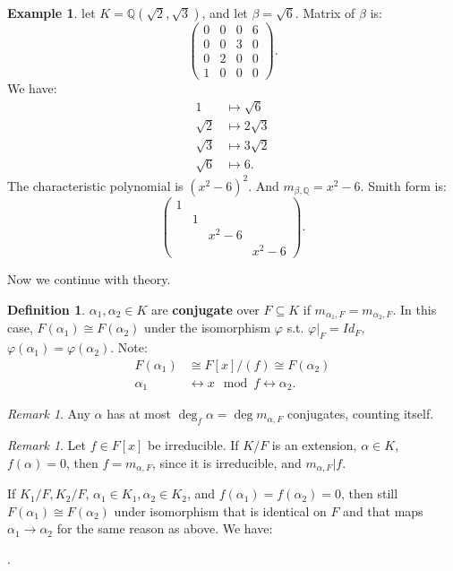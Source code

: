 \documentclass[9pt,reqno,twoside]{amsbook}
\theoremstyle{plain}
\numberwithin{section}{chapter}
\numberwithin{equation}{chapter}
\theoremstyle{definition}
\newtheorem{Def}[theorem]{Definition}
\newtheorem{Ex}[theorem]{Example}
\theoremstyle{remark}
\newtheorem{rem}[theorem]{Remark}
\theoremstyle{plain}
\newcommand{\sub}{\subseteq}
\newcommand{\Q}{\mathbb{Q}}
\newcommand{\bee}{\begin{equation}\begin{aligned}}
\newcommand{\eee}{\end{aligned}\end{equation}}
\newcommand{\lpar}{\left(}
\newcommand{\rpar}{\right)}
\renewcommand{\phi}{\varphi}
\begin{document}
\begin{Ex}
let $K = \Q(\sqrt{2},\sqrt{3})$, and let $\beta = \sqrt{6}$. Matrix of $\beta$ is:
$$
\lpar 
\begin{matrix}
0 & 0 & 0 & 6\\
0 & 0 & 3 & 0\\
0 & 2 & 0 & 0\\
1 & 0 & 0 & 0
\end{matrix} \rpar.
$$
We have:
\bee
1 &\mapsto \sqrt{6}\\
\sqrt{2} & \mapsto 2\sqrt{3}\\
\sqrt{3} & \mapsto 3 \sqrt{2}\\
\sqrt{6} &\mapsto 6.
\eee
The characteristic polynomial is $(x^2 - 6)^2$. And $m_{\beta,\Q} = x^2 - 6$. Smith form is:
$$
\lpar 
\begin{matrix}
1 & & &\\
& 1\\
& & x^2 - 6\\
&&&x^2 - 6
\end{matrix} \rpar.
$$
\end{Ex}

Now we continue with theory. 

\begin{Def}
$\alpha_1,\alpha_2 \in K$ are \textbf{conjugate} over $F \sub K$ if $m_{\alpha_1,F} = m_{\alpha_2,F}$. In this case, $F(\alpha_1) \cong F(\alpha_2)$ under the isomorphism $\phi$ s.t. $\phi|_F = Id_F$, $\phi(\alpha_1) = \phi(\alpha_2)$. Note:
\bee
F(\alpha_1)& \cong F[x]/(f) \cong F(\alpha_2)\\
\alpha_1 &\leftrightarrow x \mod f \leftrightarrow \alpha_2.
\eee
\end{Def}

\begin{rem}
Any $\alpha$ has at most $\deg_f\alpha = \deg m_{\alpha,F}$ conjugates, counting itself. 
\end{rem}

\begin{rem}
Let $f \in F[x]$ be irreducible. If $K/F$ is an extension, $\alpha \in K$, $f(\alpha) = 0$, then $f = m_{\alpha,F}$, since it is irreducible, and $m_{\alpha,F}|f$. 
\end{rem}

If $K_1/F,K_2/F$, $\alpha_1 \in K_1,\alpha_2 \in K_2$, and $f(\alpha_1) = f(\alpha_2) = 0$, then still $F(\alpha_1) \cong F(\alpha_2)$ under isomorphism that is identical on $F$ and that maps $\alpha_1 \to \alpha_2$ for the same reason as above. We have:
\begin{center}
.
\end{center}
\end{document}
